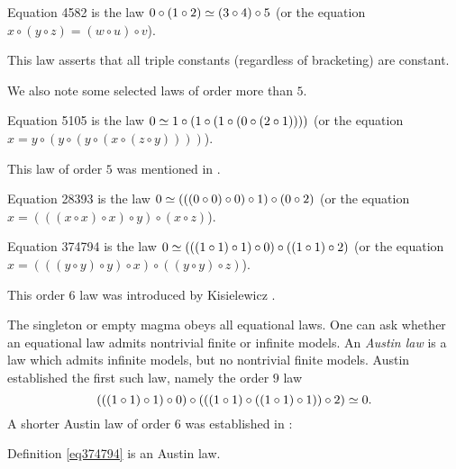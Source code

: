 \begin{definition}[Equation 4582]\label{eq4582}\leanok{}  Equation 4582 is the law $0 \circ (1 \circ 2)  \simeq  (3 \circ 4) \circ 5$ (or the equation $x \circ (y \circ z) = (w \circ u) \circ v$).
\end{definition}

This law asserts that all triple constants (regardless of bracketing) are constant.

We also note some selected laws of order more than $5$.


\begin{definition}[Equation 5105]
  \label{eq5105}
  Equation 5105 is the law $0  \simeq 1 \circ (1 \circ (1 \circ (0 \circ (2 \circ 1))))$ (or the equation $x = y \circ (y \circ (y \circ (x \circ (z \circ y))))$).
\end{definition}

This law of order $5$ was mentioned in \cite{Kisielewicz2}.

\begin{definition}[Equation 28393]
  \label{eq28393}
  Equation 28393 is the law $0  \simeq  (((0 \circ 0) \circ 0) \circ 1) \circ (0 \circ 2)$ (or the equation $x = (((x \circ x) \circ x) \circ y) \circ (x \circ z)$).
\end{definition}

\begin{definition}[Equation 374794]
  \leanok
  \label{eq374794}
  Equation 374794 is the law $0  \simeq  (((1 \circ 1) \circ 1) \circ 0) \circ ((1 \circ 1) \circ 2)$ (or the equation $x = (((y \circ y) \circ y) \circ x) \circ ((y \circ y) \circ z)$).
\end{definition}

This order $6$ law was introduced by Kisielewicz \cite{Kisielewicz}.


The singleton or empty magma obeys all equational laws.  One can ask whether an equational law admits nontrivial finite or infinite models.  An \emph{Austin law} is a law which admits infinite models, but no nontrivial finite models.  Austin \cite{austin} established the first such law, namely the order $9$ law
$$ (((1 \circ 1) \circ 1) \circ 0) \circ (((1 \circ 1) \circ ((1 \circ 1) \circ 1)) \circ 2) \simeq 0.$$
A shorter Austin law of order $6$ was established in \cite{Kisielewicz}:

\begin{theorem}
  \leanok
  \label{kis-thm}
  Definition \ref{eq374794} is an Austin law.
\end{theorem}

